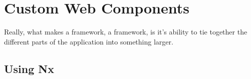 \chapter{ Custom Web Components }
Really, what makes a framework, a framework, is it's ability to tie together the different parts of the application into something larger. 

\section{Using Nx}